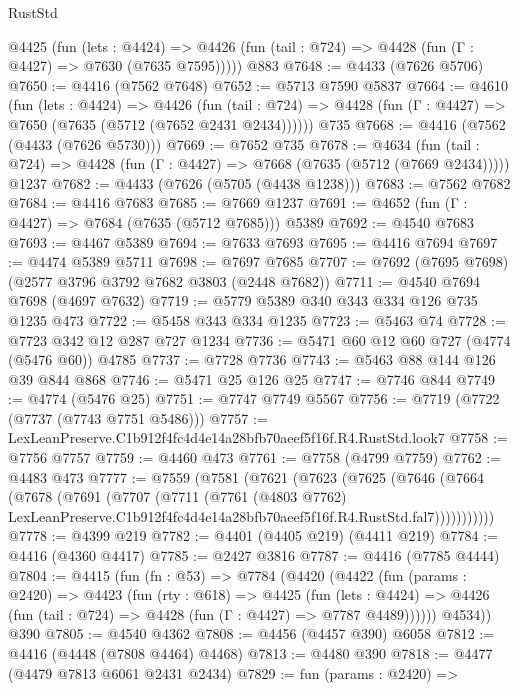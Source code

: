 \begin{lexlean}{RustStd}
\begin{coremodule}
    @4425
      (fun (lets : @4424) =>
      @4426 (fun (tail : @724) => @4428 (fun (Γ : @4427) => @7630 (@7635 @7595)))))
    @883
@7648 := @4433 (@7626 @5706)
@7650 := @4416 (@7562 @7648)
@7652 := @5713 @7590 @5837
@7664 := @4610
    (fun (lets : @4424) =>
    @4426
      (fun (tail : @724) => @4428 (fun (Γ : @4427) => @7650 (@7635 (@5712 (@7652 @2431 @2434))))))
    @735
@7668 := @4416 (@7562 (@4433 (@7626 @5730)))
@7669 := @7652 @735
@7678 := @4634
    (fun (tail : @724) => @4428 (fun (Γ : @4427) => @7668 (@7635 (@5712 (@7669 @2434)))))
    @1237
@7682 := @4433 (@7626 (@5705 (@4438 @1238)))
@7683 := @7562 @7682
@7684 := @4416 @7683
@7685 := @7669 @1237
@7691 := @4652 (fun (Γ : @4427) => @7684 (@7635 (@5712 @7685))) @5389
@7692 := @4540 @7683
@7693 := @4467 @5389
@7694 := @7633 @7693
@7695 := @4416 @7694
@7697 := @4474 @5389 @5711
@7698 := @7697 @7685
@7707 := @7692 (@7695 @7698) (@2577 @3796 @3792 @7682 @3803 (@2448 @7682))
@7711 := @4540 @7694 @7698 (@4697 @7632)
@7719 := @5779 @5389 @340 @343 @334 @126 @735 @1235 @473
@7722 := @5458 @343 @334 @1235
@7723 := @5463 @74
@7728 := @7723 @342 @12 @287 @727 @1234
@7736 := @5471 @60 @12 @60 @727 (@4774 (@5476 @60)) @4785
@7737 := @7728 @7736
@7743 := @5463 @88 @144 @126 @39 @844 @868
@7746 := @5471 @25 @126 @25
@7747 := @7746 @844
@7749 := @4774 (@5476 @25)
@7751 := @7747 @7749 @5567
@7756 := @7719 (@7722 (@7737 (@7743 @7751 @5486)))
@7757 := LexLeanPreserve.C1b912f4fc4d4e14a28bfb70aeef5f16f.R4.RustStd.look7
@7758 := @7756 @7757
@7759 := @4460 @473
@7761 := @7758 (@4799 @7759)
@7762 := @4483 @473
@7777 := @7559
    (@7581
      (@7621
        (@7623
          (@7625
            (@7646
              (@7664
                (@7678
                  (@7691
                    (@7707
                      (@7711
                        (@7761
                          (@4803 @7762)
                          LexLeanPreserve.C1b912f4fc4d4e14a28bfb70aeef5f16f.R4.RustStd.fal7)))))))))))
@7778 := @4399 @219
@7782 := @4401 (@4405 @219) (@4411 @219)
@7784 := @4416 (@4360 @4417)
@7785 := @2427 @3816
@7787 := @4416 (@7785 @4444)
@7804 := @4415
    (fun (fn : @53) =>
    @7784
      (@4420
        (@4422
          (fun (params : @2420) =>
          @4423
            (fun (rty : @618) =>
            @4425
              (fun (lets : @4424) =>
              @4426 (fun (tail : @724) => @4428 (fun (Γ : @4427) => @7787 @4489))))))
        @4534))
    @390
@7805 := @4540 @4362
@7808 := @4456 (@4457 @390) @6058
@7812 := @4416 (@4448 (@7808 @4464) @4468)
@7813 := @4480 @390
@7818 := @4477 (@4479 @7813 @6061 @2431 @2434)
@7829 := fun (params : @2420) =>

\end{coremodule}
\end{lexlean}

